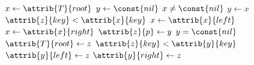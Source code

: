 \begin{codebox}
\li $x \gets \attrib{T}{root}$
\li $y \gets \const{nil}$
\li \While $x \neq \const{nil}$
\li \Do
        $y \gets x$
\li     \If $\attrib{z}{key} < \attrib{x}{key}$
\li     \Then
            $x \gets \attrib{x}{left}$
\li     \Else
\li         $x \gets \attrib{x}{right}$
        \End
    \End
\li $\attrib{z}{p} \gets y$
\li \If $y = \const{nil}$
\li \Then
        $\attrib{T}{root} \gets z$
\li \Else 
\li     \If $\attrib{z}{key} < \attrib{y}{key}$
\li     \Then
            $\attrib{y}{left} \gets z$
\li     \Else
\li         $\attrib{y}{right} \gets z$
        \End
    \End
\end{codebox}